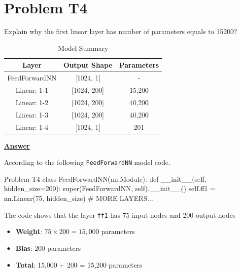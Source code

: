 \documentclass[12pt, a4paper]{article}
\begin{document}
        \section{Problem T4}
            Explain why the first linear layer has number of parameters equals to 15200?

            \begin{table}[h]
                \centering
                \begin{tabular}{|c|c|c|}
                    \hline
                    \textbf{Layer} & \textbf{Output Shape} & \textbf{Parameters} \\
                    \hline \hline
                    FeedForwardNN & [1024, 1] & - \\
                    Linear: 1-1 & [1024, 200] & 15,200 \\
                    Linear: 1-2 & [1024, 200] & 40,200 \\
                    Linear: 1-3 & [1024, 200] & 40,200 \\
                    Linear: 1-4 & [1024, 1] & 201 \\
                    \hline
                \end{tabular}
                \caption{Model Summary}
            \end{table}
            
            \vspace{1em}

            \noindent \underline{\textbf{Answer}}

            \vspace{0.25em}

            \noindent According to the following \texttt{FeedForwardNN} model code.

            \begin{codeblock}{Problem T4}
                class FeedForwardNN(nn.Module):
                    def __init__(self, hidden_size=200):
                        super(FeedForwardNN, self).__init__()
                        self.ff1 = nn.Linear(75, hidden_size)
                        # MORE LAYERS...
            \end{codeblock}

            \noindent The code shows that the layer \texttt{ff1} has 75 input nodes and 200 output nodes
            \begin{itemize}
                \item \textbf{Weight}: $75 \times 200 = 15,000$ parameters
                \item \textbf{Bias}: 200 parameters
                \item \textbf{Total}: 15,000 + 200 = 15,200 parameters
            \end{itemize}
        
\end{document}
